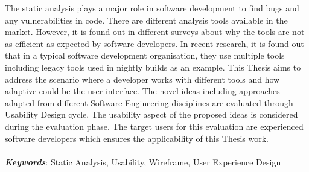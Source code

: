 The static analysis plays a major role in software development to find bugs and any vulnerabilities in code. There are different analysis tools available in the market. However, it is found out in different surveys about why the tools are not as efficient as expected by software developers. In recent research, it is found out that in a typical software development organisation, they use multiple tools including legacy tools used in nightly builds as an example. This Thesis aims to address the scenario where a developer works with different tools and how adaptive could be the user interface. The novel ideas including approaches adapted from different Software Engineering disciplines are evaluated through Usability Design cycle. The usability aspect of the proposed ideas is considered during the evaluation phase. The target users for this evaluation are experienced software developers which ensures the applicability of this Thesis work. \\ \\
\textbf{\textit{Keywords}}: Static Analysis, Usability, Wireframe, User Experience Design
